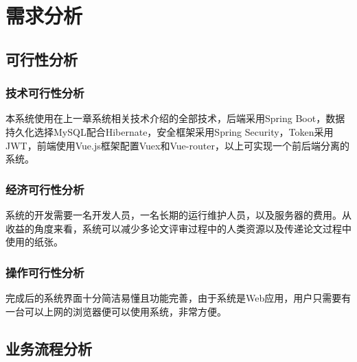 
\chapter{需求分析}
\label{需求分析}

\section{可行性分析}

\subsection{技术可行性分析}

本系统使用在上一章系统相关技术介绍的全部技术，后端采用Spring Boot，数据持久化选择MySQL配合Hibernate，安全框架采用Spring Security，Token采用JWT，前端使用Vue.js框架配置Vuex和Vue-router，以上可实现一个前后端分离的系统。

\subsection{经济可行性分析}

系统的开发需要一名开发人员，一名长期的运行维护人员，以及服务器的费用。从收益的角度来看，系统可以减少多论文评审过程中的人类资源以及传递论文过程中使用的纸张。

\subsection{操作可行性分析}

完成后的系统界面十分简洁易懂且功能完善，由于系统是Web应用，用户只需要有一台可以上网的浏览器便可以使用系统，非常方便。

\section{业务流程分析}

